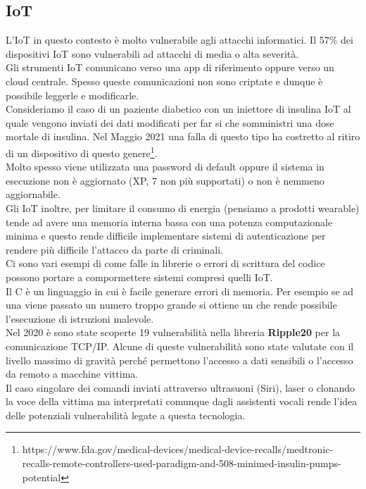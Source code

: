 \subsection{IoT}
L'\acrshort{IoT} in questo contesto è molto vulnerabile agli attacchi informatici. Il 57\% dei dispositivi \acrshort{IoT} sono vulnerabili ad attacchi di media o alta severità.\\
Gli strumenti \acrshort{IoT} comunicano verso una app di riferimento oppure verso un cloud centrale.
Spesso queste comunicazioni non sono criptate e dunque è possibile leggerle e modificarle.\\
Consideriamo il caso di un paziente diabetico con un iniettore di insulina \acrshort{IoT} al quale vengono inviati dei dati modificati per far si che somministri una dose mortale di insulina.
Nel Maggio 2021 una falla di questo tipo ha costretto al ritiro di un dispositivo di questo genere\footnote{https://www.fda.gov/medical-devices/medical-device-recalls/medtronic-recalls-remote-controllers-used-paradigm-and-508-minimed-insulin-pumps-potential}.\\
Molto spesso viene utilizzata una password di default oppure il sistema in esecuzione non è aggiornato (XP, 7 non più supportati) o non è nemmeno aggiornabile.\\
Gli \acrshort{IoT} inoltre, per limitare il consumo di energia (pensiamo a prodotti wearable) tende ad avere una memoria interna bassa con una potenza computazionale minima e questo rende difficile implementare sistemi di autenticazione per rendere più difficile l'attacco da parte di criminali.\\
Ci sono vari esempi di come falle in librerie o errori di scrittura del codice possono portare a compormettere sistemi compresi quelli \acrshort{IoT}.\\
Il C è un linguaggio in cui è facile generare errori di memoria. Per esempio se ad una  viene passato un numero troppo grande si ottiene un  che rende possibile l'esecuzione di istruzioni malevole.\\
Nel 2020 è sono state scoperte 19 vulnerabilità nella libreria \textbf{Ripple20} per la comunicazione \acrfull{TCP/IP}. Alcune di queste vulnerabilità sono state valutate con il livello massimo di gravità perché permettono l'accesso a dati sensibili o l'accesso da remoto a macchine vittima.\\
Il caso singolare dei comandi inviati attraverso ultrasuoni (Siri), laser o clonando la voce della vittima ma interpretati comunque dagli assistenti vocali rende l'idea delle potenziali vulnerabilità legate a questa tecnologia.\\
